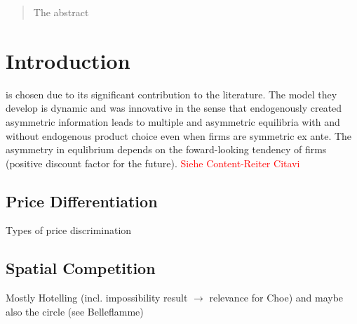 \documentclass[a4paper, 11 pt, fleqn]{article}
\begin{document}
\newpage
{}
\tableofcontents
\listoffigures
\newpage


\newpage


\begin{abstract}
	The abstract
\end{abstract}
%
\section{Introduction} \label{sec:intro}
%
\citet{Choe.2018} is chosen due to its significant contribution to the literature. The model they develop is dynamic and
was innovative in the sense that endogenously created asymmetric information leads to multiple and asymmetric equilibria with
and without endogenous product choice even when firms are symmetric ex ante. The asymmetry in equlibrium depends on the foward-looking
tendency of firms (positive discount factor for the future). \textcolor{red}{Siehe Content-Reiter Citavi}

\subsection{Price Differentiation} \label{ssec:price-diff}
Types of price discrimination
%
\subsection{Spatial Competition}
Mostly Hotelling (incl. impossibility result $\to$ relevance for Choe) and maybe also the circle (see Belleflamme)
%
\end{document}
